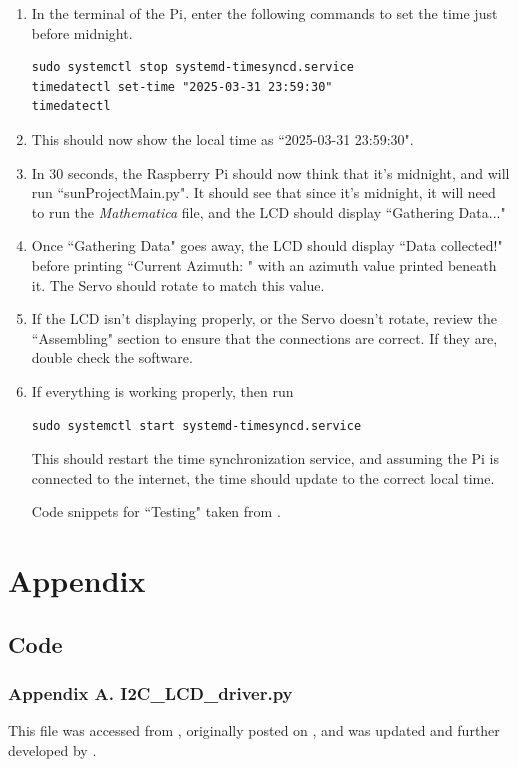 \documentclass[titlepage]{article}
\begin{document}
\begin{enumerate}
\subsection*{Testing}
    \item In the terminal of the Pi, enter the following commands to set the time just before midnight. 
    \begin{lstlisting}
sudo systemctl stop systemd-timesyncd.service 
timedatectl set-time "2025-03-31 23:59:30"
timedatectl   \end{lstlisting}
    \item This should now show the local time as ``2025-03-31 23:59:30". 
    \item In 30 seconds, the Raspberry Pi should now think that it's midnight, and will run ``sunProjectMain.py". It should see that since it's midnight, it will need to run the \textit{Mathematica} file, and the LCD should display ``Gathering Data..." 
    \item Once ``Gathering Data" goes away, the LCD should display ``Data collected!" before printing ``Current Azimuth: " with an azimuth value printed beneath it. The Servo should rotate to match this value. 
    \item If the LCD isn't displaying properly, or the Servo doesn't rotate, review the ``Assembling" section to ensure that the connections are correct. If they are, double check the software. 
    \item If everything is working properly, then run 
    \begin{lstlisting}
sudo systemctl start systemd-timesyncd.service  \end{lstlisting}
    This should restart the time synchronization service, and assuming the Pi is connected to the internet, the time should update to the correct local time. \par
    Code snippets for ``Testing" taken from \cite{time_sync}.
\end{enumerate}

\newpage

\section*{Appendix}
\subsection*{Code}
\subsubsection*{Appendix A. I2C\_LCD\_driver.py}
This file was accessed from \cite{lcd_driver_location}, originally posted on \cite{original_lcd_driver_location}, and was updated and further developed by \cite{DenisFromHR}.

\end{document}
